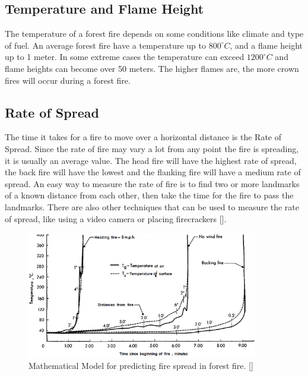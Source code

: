 \subsection{Temperature and Flame Height}
The temperature of a forest fire depends on some conditions like climate and type of fuel. An average forest fire have a temperature up to $800^{\circ}C$, and a flame height up to 1 meter. In some extreme cases the temperature can exceed $1200^{\circ}C$ and flame heights can become over 50 meters. The higher flames are, the more crown fires will occur during a forest fire.
\subsection{Rate of Spread}
The time it takes for a fire to move over a horizontal distance is the Rate of Spread. Since the rate of fire may vary a lot from any point the fire is spreading, it is usually an average value. The head fire will have the highest rate of spread, the back fire will have the lowest and the flanking fire will have a medium rate of spread. An easy way to measure the rate of fire is to find two or more landmarks of a known distance from each other, then take the time for the fire to pass the landmarks. There are also other techniques that can be used to measure the rate of spread, like using a video camera or placing firecrackers [].
\begin{figure}[here]
  \centering
      \includegraphics[width=0.9\textwidth]{theory/graphics/fire-prediction.jpg}
  \caption{Mathematical Model for predicting fire spread in forest fire. [] }
  \label{fig:fire-prediction}
\end{figure}
